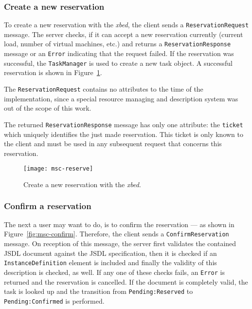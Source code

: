\subsubsection{Create a new reservation}

To  create a  new reservation  with the  \emph{xbed}, the  client  sends a
\texttt{ReservationRequest} message.  The server  checks, if it can accept
a  new reservation currently  (current load,  number of  virtual machines,
etc.)    and  returns   a  \texttt{ReservationResponse}   message   or  an
\texttt{Error} indicating that the  request failed. If the reservation was
successful,  the  \texttt{TaskManager}  is  used  to  create  a  new  task
object. A successful reservation is shown in Figure~\ref{fig:msc-reserve}.

\bigskip

The \texttt{ReservationRequest} contains no  attributes to the time of the
implementation, since  a special resource managing  and description system
was  out  of  the  scope  of   this  work.

The returned \texttt{ReservationResponse}  message has only one attribute:
the   \texttt{ticket}   which    uniquely   identifies   the   just   made
reservation. This ticket  is only known to the client and  must be used in
any subsequent request that concerns this reservation.

\begin{figure}[ht]
  \centering
  \texttt{[image: msc-reserve]}
  \caption[MSC Create  Reservation]{Create   a  new  reservation  with  the
    \emph{xbed}.}
  \label{fig:msc-reserve}
\end{figure}


\subsubsection{Confirm a reservation}

The next a user may want to do, is to confirm the reservation --- as shown
in   Figure~\ref{fig:msc-confirm}.    Therefore,   the  client   sends   a
\texttt{ConfirmReservation}  message. On  reception of  this  message, the
server  first  validates the  contained  JSDL  document  against the  JSDL
specification,  then  it  is  checked  if  an  \texttt{InstanceDefinition}
element  is included  and  finally  the validity  of  this description  is
checked, as well.  If any one  of these checks fails, an \texttt{Error} is
returned and the  reservation is cancelled. If the  document is completely
valid,    the   task   is    looked   up    and   the    transition   from
\texttt{Pending:Reserved}  to \texttt{Pending:Confirmed} is  performed.


